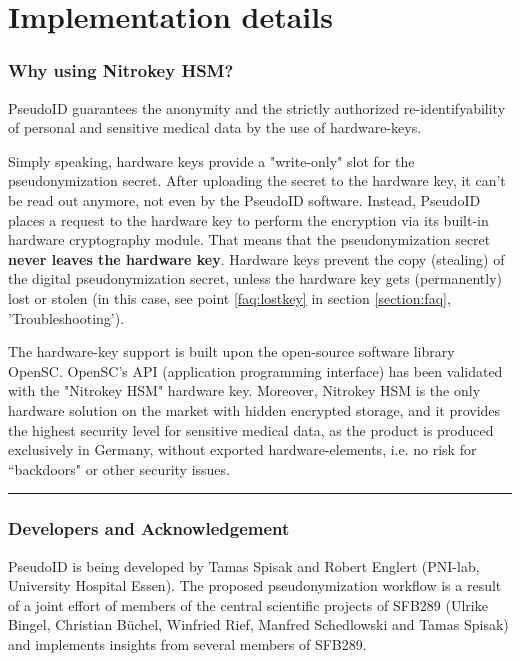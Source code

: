 
\section{Implementation details}
\subsubsection*{Why using Nitrokey HSM?}

PseudoID guarantees the anonymity and the strictly authorized re-identifyability of personal and sensitive medical data by the use of hardware-keys.

Simply speaking, hardware keys provide a "write-only" slot for the pseudonymization secret. After uploading the secret to the hardware key, it can't be read out anymore, not even by the PseudoID software. Instead, PseudoID places a request to the hardware key to perform the encryption via its built-in hardware cryptography module. That means that the pseudonymization secret \textbf{never leaves the hardware key}. Hardware keys prevent the copy (stealing) of the digital pseudonymization secret, unless the hardware key gets (permanently) lost or stolen (in this case, see point \ref{faq:lostkey} in section \ref{section:faq}, 'Troubleshooting').

The hardware-key support is built upon the open-source software library OpenSC. OpenSC's API (application programming interface) has been validated with the "Nitrokey HSM" hardware key. Moreover, Nitrokey HSM is the only hardware solution on the market with hidden encrypted storage, and it provides the highest security level for sensitive medical data, as the product is produced exclusively in Germany, without exported hardware-elements, i.e. no risk for “backdoors" or other security issues.

\par\noindent\rule{\textwidth\color{pniblue}}{0.4pt}
\subsubsection*{Developers and Acknowledgement}

PseudoID is being developed by Tamas Spisak and Robert Englert (PNI-lab, University Hospital Essen). The proposed pseudonymization workflow is a result of a joint effort of members of the central scientific projects of SFB289 (Ulrike Bingel, Christian Büchel, Winfried Rief, Manfred Schedlowski and Tamas Spisak) and implements insights from several members of SFB289.